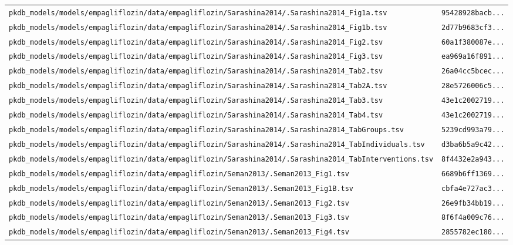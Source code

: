 \begin{longtable}{ll}
\texttt{pkdb\_models/models/empagliflozin/data/empagliflozin/Sarashina2014/.Sarashina2014\_Fig1a.tsv} & \texttt{95428928bacb...} \\
\texttt{pkdb\_models/models/empagliflozin/data/empagliflozin/Sarashina2014/.Sarashina2014\_Fig1b.tsv} & \texttt{2d77b9683cf3...} \\
\texttt{pkdb\_models/models/empagliflozin/data/empagliflozin/Sarashina2014/.Sarashina2014\_Fig2.tsv} & \texttt{60a1f380087e...} \\
\texttt{pkdb\_models/models/empagliflozin/data/empagliflozin/Sarashina2014/.Sarashina2014\_Fig3.tsv} & \texttt{ea969a16f891...} \\
\texttt{pkdb\_models/models/empagliflozin/data/empagliflozin/Sarashina2014/.Sarashina2014\_Tab2.tsv} & \texttt{26a04cc5bcec...} \\
\texttt{pkdb\_models/models/empagliflozin/data/empagliflozin/Sarashina2014/.Sarashina2014\_Tab2A.tsv} & \texttt{28e5726006c5...} \\
\texttt{pkdb\_models/models/empagliflozin/data/empagliflozin/Sarashina2014/.Sarashina2014\_Tab3.tsv} & \texttt{43e1c2002719...} \\
\texttt{pkdb\_models/models/empagliflozin/data/empagliflozin/Sarashina2014/.Sarashina2014\_Tab4.tsv} & \texttt{43e1c2002719...} \\
\texttt{pkdb\_models/models/empagliflozin/data/empagliflozin/Sarashina2014/.Sarashina2014\_TabGroups.tsv} & \texttt{5239cd993a79...} \\
\texttt{pkdb\_models/models/empagliflozin/data/empagliflozin/Sarashina2014/.Sarashina2014\_TabIndividuals.tsv} & \texttt{d3ba6b5a9c42...} \\
\texttt{pkdb\_models/models/empagliflozin/data/empagliflozin/Sarashina2014/.Sarashina2014\_TabInterventions.tsv} & \texttt{8f4432e2a943...} \\
\texttt{pkdb\_models/models/empagliflozin/data/empagliflozin/Seman2013/.Seman2013\_Fig1.tsv} & \texttt{6689b6ff1369...} \\
\texttt{pkdb\_models/models/empagliflozin/data/empagliflozin/Seman2013/.Seman2013\_Fig1B.tsv} & \texttt{cbfa4e727ac3...} \\
\texttt{pkdb\_models/models/empagliflozin/data/empagliflozin/Seman2013/.Seman2013\_Fig2.tsv} & \texttt{26e9fb34bb19...} \\
\texttt{pkdb\_models/models/empagliflozin/data/empagliflozin/Seman2013/.Seman2013\_Fig3.tsv} & \texttt{8f6f4a009c76...} \\
\texttt{pkdb\_models/models/empagliflozin/data/empagliflozin/Seman2013/.Seman2013\_Fig4.tsv} & \texttt{2855782ec180...} \\

\end{longtable}
